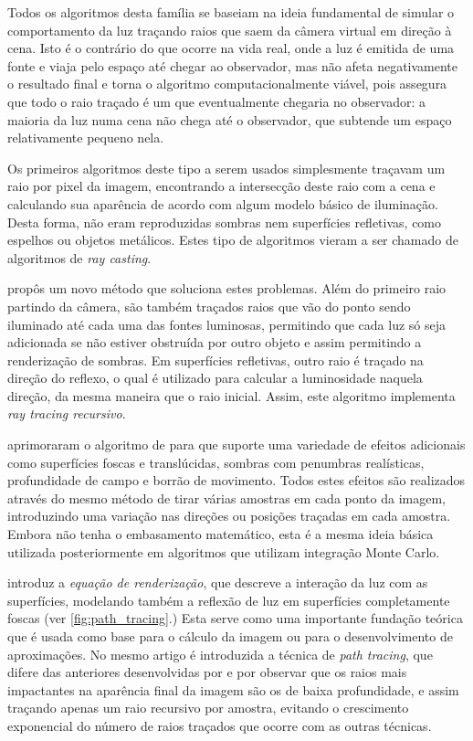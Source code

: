 \documentclass[tg]{mdtufsm}
\begin{document}
Todos os algoritmos desta família se baseiam na ideia fundamental de simular o comportamento da luz
traçando raios que saem da câmera virtual em direção à cena. Isto é o contrário do que ocorre na
vida real, onde a luz é emitida de uma fonte e viaja pelo espaço até chegar ao observador, mas não
afeta negativamente o resultado final e torna o algoritmo computacionalmente viável, pois assegura
que todo o raio traçado é um que eventualmente chegaria no observador: a maioria da luz numa cena
não chega até o observador, que subtende um espaço relativamente pequeno nela. \citep{pharr2010}

Os primeiros algoritmos deste tipo a serem usados simplesmente traçavam um raio por pixel da imagem,
encontrando a intersecção deste raio com a cena e calculando sua aparência de acordo com algum
modelo básico de iluminação. Desta forma, não eram reproduzidas sombras nem superfícies refletivas,
como espelhos ou objetos metálicos. Estes tipo de algoritmos vieram a ser chamado de algoritmos de
\emph{ray casting}.

 propôs um novo método que soluciona estes problemas. Além do primeiro raio
partindo da câmera, são também traçados raios que vão do ponto sendo iluminado até cada uma das
fontes luminosas, permitindo que cada luz só seja adicionada se não estiver obstruída por outro
objeto e assim permitindo a renderização de sombras. Em superfícies refletivas, outro raio é traçado
na direção do reflexo, o qual é utilizado para calcular a luminosidade naquela direção, da mesma
maneira que o raio inicial. Assim, este algoritmo implementa \emph{ray tracing recursivo}.

 aprimoraram o algoritmo de \citeauthor{whitted1980} para que suporte uma variedade
de efeitos adicionais como superfícies foscas e translúcidas, sombras com penumbras realísticas,
profundidade de campo e borrão de movimento. Todos estes efeitos são realizados através do mesmo
método de tirar várias amostras em cada ponto da imagem, introduzindo uma variação nas direções ou
posições traçadas em cada amostra. Embora não tenha o embasamento matemático, esta é a mesma ideia
básica utilizada posteriormente em algoritmos que utilizam integração Monte Carlo.

 introduz a \emph{equação de renderização}, que descreve a interação da luz com as
superfícies, modelando também a reflexão de luz em superfícies completamente foscas (ver
\autoref{fig:path_tracing}.) Esta serve como uma importante fundação teórica que é usada como base
para o cálculo da imagem ou para o desenvolvimento de aproximações. No mesmo artigo é introduzida a
técnica de \emph{path tracing}, que difere das anteriores desenvolvidas por \citeauthor{cook1984} e
\citeauthor{whitted1980} por observar que os raios mais impactantes na aparência final da imagem são
os de baixa profundidade, e assim traçando apenas um raio recursivo por amostra, evitando o
crescimento exponencial do número de raios traçados que ocorre com as outras técnicas.
\end{document}
